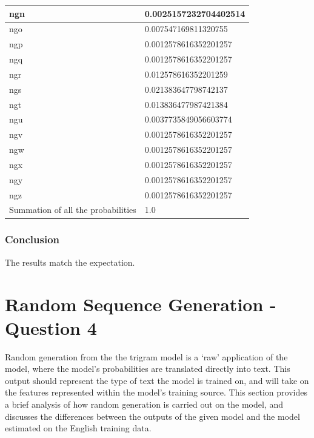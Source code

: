 \documentclass[12pt]{article}
\begin{document}
\begin{center}
\begin{longtable}{ | m{10em} | m{10em} | }
		
		\hline
		ngn   &  0.0025157232704402514\\
		\hline
		
		
		\hline
		ngo   &  0.007547169811320755\\
		\hline
		
		
		\hline
		ngp   &  0.0012578616352201257\\
		\hline
		
		\hline
		ngq   &  0.0012578616352201257\\
		\hline
		
		\hline
		ngr    & 0.012578616352201259\\
		\hline
		
		\hline
		ngs   &  0.021383647798742137\\
		\hline
		
		\hline
		ngt    & 0.013836477987421384\\
		\hline
		
		\hline
		ngu    & 0.0037735849056603774\\
		\hline
		
		
		\hline
		ngv     & 0.0012578616352201257\\
		\hline
		
		\hline
		ngw    & 0.0012578616352201257\\
		\hline
		
		
		\hline
		ngx    & 0.0012578616352201257\\
		\hline
		
		\hline
		ngy    & 0.0012578616352201257\\
		\hline
		
		\hline
		ngz    & 0.0012578616352201257\\
		\hline
		
		\hline
		Summation of all the probabilities   &  1.0\\
		\hline
	\end{longtable}
\end{center}

\subsubsection{Conclusion}
The results match the expectation.

\section{Random Sequence Generation - Question 4}
Random generation from the the trigram model is a `raw' application of the model, where the model's probabilities are translated directly into text.  This output should represent the type of text the model is trained on, and will  take on the features represented within the model's training source.  This section provides a brief analysis of how random generation is carried out on the model, and discusses the differences between the outputs of the given model and the model estimated on the English training data.
\end{document}
